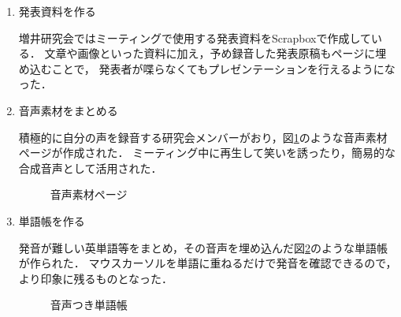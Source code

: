 \begin{enumerate}

\item 発表資料を作る

増井研究会ではミーティングで使用する発表資料をScrapboxで作成している．
文章や画像といった資料に加え，予め録音した発表原稿もページに埋め込むことで，
発表者が喋らなくてもプレゼンテーションを行えるようになった．

\item 音声素材をまとめる

積極的に自分の声を録音する研究会メンバーがおり，図\ref{hayakawa}のような音声素材ページが作成された．
ミーティング中に再生して笑いを誘ったり，簡易的な合成音声として活用された．

\begin{figure}[H]
\centering
{}
\caption{音声素材ページ}
\label{hayakawa}
\end{figure}

\item 単語帳を作る

発音が難しい英単語等をまとめ，その音声を埋め込んだ図\ref{word}のような単語帳が作られた．
マウスカーソルを単語に重ねるだけで発音を確認できるので，より印象に残るものとなった．

\begin{figure}[H]
\centering
{}
\caption{音声つき単語帳}
\label{word}
\end{figure}

\end{enumerate}